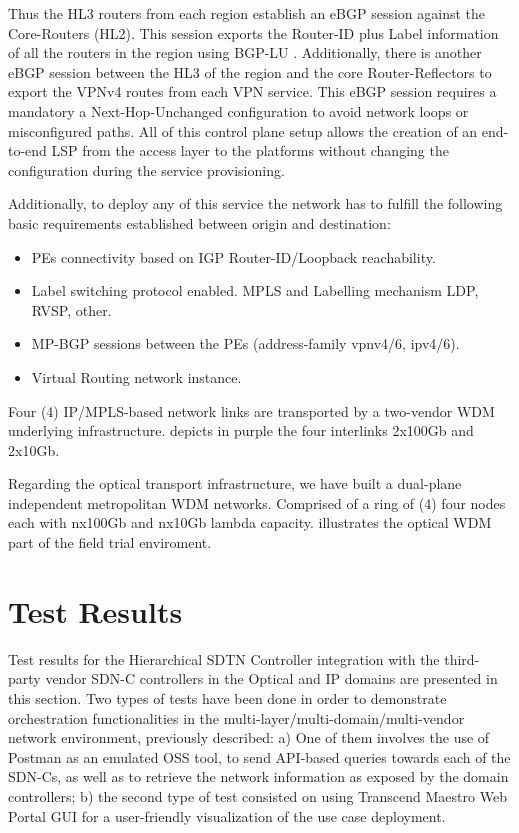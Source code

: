 \documentclass[a4paper,fleqn]{cas-dc}
\begin{document}
Thus the HL3 routers from each region establish an eBGP session against the Core-Routers (HL2). This session exports the Router-ID plus Label information of all the routers in the region using BGP-LU \cite{rfc8277}. Additionally, there is another eBGP session between the HL3 of the region and the core Router-Reflectors to export the VPNv4 routes from each VPN service. This eBGP session requires a mandatory a Next-Hop-Unchanged configuration to avoid network loops or misconfigured paths. All of this control plane setup allows the creation of an end-to-end LSP from the access layer to the platforms without changing the configuration during the service provisioning.

Additionally, to deploy any of this service the network has to fulfill the following basic requirements established between origin and destination:
\begin{itemize}
    \item PEs connectivity based on IGP Router-ID/Loopback reachability.
    \item Label switching protocol enabled. MPLS and Labelling mechanism LDP, RVSP, other. 
    \item MP-BGP sessions between the PEs (address-family vpnv4/6, ipv4/6).
    \item Virtual Routing network instance. 
\end{itemize}

Four (4) IP/MPLS-based network links are transported by a two-vendor WDM underlying infrastructure.  depicts in purple the four interlinks 2x100Gb and 2x10Gb.  

Regarding the optical transport infrastructure, we have built a dual-plane independent metropolitan WDM networks. Comprised of a ring of (4) four nodes each with nx100Gb and nx10Gb lambda capacity.  illustrates the optical WDM part of the field trial enviroment.


\section{Test Results}
\label{section:results}

Test results for the Hierarchical SDTN Controller integration with the third-party vendor SDN-C controllers in the Optical and IP domains are presented in this section. Two types of tests have been done in order to demonstrate orchestration functionalities in the multi-layer/multi-domain/multi-vendor network environment, previously described: a) One of them involves the use of Postman as an emulated OSS tool, to send API-based queries towards each of the SDN-Cs, as well as to retrieve the network information as exposed by the domain controllers; b) the second type of test consisted on using Transcend Maestro Web Portal GUI for a user-friendly visualization of the use case deployment.
\end{document}
